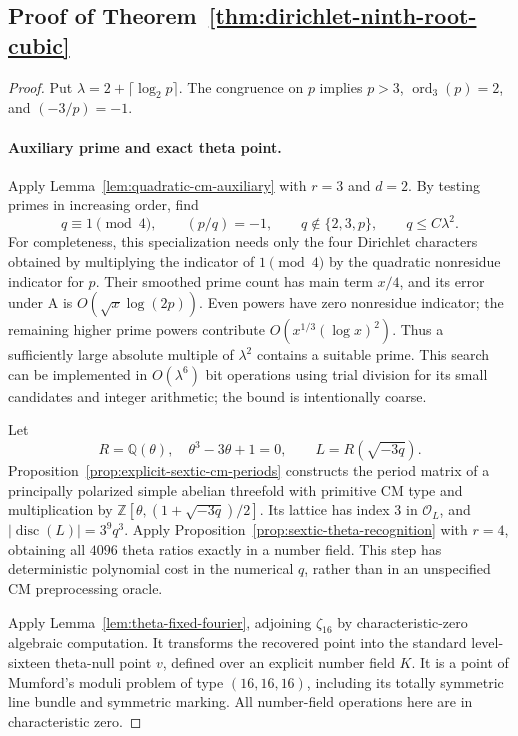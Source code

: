 \documentclass[11pt]{article}
\theoremstyle{definition}
\theoremstyle{remark}
\begin{document}
\subsection*{Proof of Theorem~\ref{thm:dirichlet-ninth-root-cubic}}
\begin{proof}
Put \(\lambda=2+\lceil\log_2p\rceil\). The congruence on \(p\)
implies \(p>3\), \(\operatorname{ord}_3(p)=2\), and
\(({-3}/p)=-1\).

\paragraph{Auxiliary prime and exact theta point.}
Apply Lemma~\ref{lem:quadratic-cm-auxiliary} with \(r=3\) and
\(d=2\). By testing primes in increasing order, find
\[
 q\equiv1\pmod4,\qquad (p/q)=-1,\qquad
 q\notin\{2,3,p\},\qquad q\le C\lambda^2.
\]
For completeness, this specialization needs only the four
Dirichlet characters obtained by multiplying the indicator of
\(1\pmod4\) by the quadratic nonresidue indicator for \(p\).
Their smoothed prime count has main term \(x/4\), and its error
under \(\mathrm A\) is \(O(\sqrt x\log(2p))\). Even powers
have zero nonresidue indicator; the remaining higher prime powers
contribute \(O(x^{1/3}(\log x)^2)\). Thus a sufficiently large
absolute multiple of \(\lambda^2\) contains a suitable prime.
This search can be implemented in \(O(\lambda^6)\) bit operations
using trial division for its small candidates and integer
arithmetic; the bound is intentionally coarse.

Let
\[
 R=\mathbb Q(\theta),\quad \theta^3-3\theta+1=0,
 \qquad L=R(\sqrt{-3q}).
\]
Proposition~\ref{prop:explicit-sextic-cm-periods} constructs the
period matrix of a principally polarized simple abelian threefold
with primitive CM type and multiplication by
\(\mathbb Z[\theta,(1+\sqrt{-3q})/2]\). Its lattice has index
\(3\) in \(\mathcal O_L\), and
\(|\operatorname{disc}(L)|=3^9q^3\).
Apply Proposition~\ref{prop:sextic-theta-recognition} with
\(r=4\), obtaining all \(4096\) theta ratios exactly in a
number field. This step has deterministic polynomial cost in
the numerical \(q\), rather than in an unspecified CM
preprocessing oracle.

Apply Lemma~\ref{lem:theta-fixed-fourier}, adjoining
\(\zeta_{16}\) by characteristic-zero algebraic computation.
It transforms the recovered point into the standard
level-sixteen theta-null point \(v\), defined over an explicit
number field \(K\). It is a point of Mumford's moduli problem
of type \((16,16,16)\), including its totally symmetric line
bundle and symmetric marking. All number-field operations here
are in characteristic zero.


\end{proof}
\end{document}
